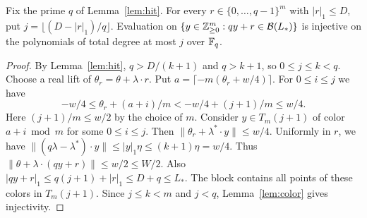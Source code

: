 \begin{lemma}\label{lem:block}
Fix the prime $q$ of Lemma~\ref{lem:hit}. For every
$r\in\{0,\ldots,q-1\}^m$ with $|r|_1\le D$, put
$j=\lfloor(D-|r|_1)/q\rfloor$. Evaluation on
$\{y\in\mathbb Z_{\ge0}^m:qy+r\in\mathcal B(L_*)\}$ is injective
on the polynomials of total degree at most $j$ over $\mathbb F_q$.
\end{lemma}

\begin{proof}
By Lemma~\ref{lem:hit}, $q>D/(k+1)$ and $q>k+1$, so $0\le j\le k<q$.
Choose a real lift of $\theta_r=\theta+\lambda\cdot r$. Put
$a=\lceil-m(\theta_r+w/4)\rceil$. For $0\le i\le j$ we have
\[
 -w/4\le\theta_r+(a+i)/m<-w/4+(j+1)/m\le w/4 .
\]
Here $(j+1)/m\le w/2$ by the choice of $m$.
Consider $y\in T_m(j+1)$ of color $a+i\bmod m$ for some
$0\le i\le j$. Then $\|\theta_r+\lambda^*\cdot y\|\le w/4$.
Uniformly in $r$, we have
$\|(q\lambda-\lambda^*)\cdot y\|\le |y|_1\eta\le(k+1)\eta=w/4$. Thus
$\|\theta+\lambda\cdot(qy+r)\|\le w/2\le W/2$.
Also $|qy+r|_1\le q(j+1)+|r|_1\le D+q\le L_*$. The block contains
all points of these colors in $T_m(j+1)$. Since $j\le k<m$
and $j<q$, Lemma~\ref{lem:color} gives injectivity.
\end{proof}
